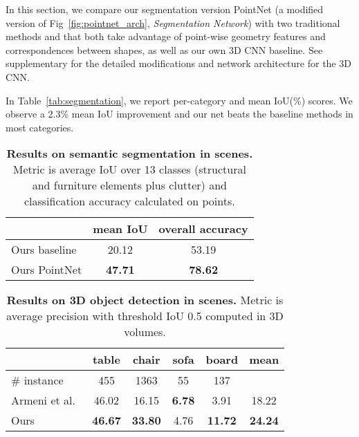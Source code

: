 \documentclass[10pt,twocolumn,letterpaper]{article}
\begin{document}
In this section, we compare our segmentation version PointNet (a modified version of Fig~\ref{fig:pointnet_arch}, \textit{Segmentation Network}) with two traditional methods \cite{Wu2014248} and \cite{Yi16} that both take advantage of point-wise geometry features and correspondences between shapes, as well as our own 3D CNN baseline.
See supplementary for the detailed modifications and network architecture for the 3D CNN.

In Table~\ref{tab:segmentation}, we report per-category and mean IoU(\%) scores. We observe a 2.3\% mean IoU improvement and our net beats the baseline methods in most categories.


\begin{table}[b!]
    \centering
    \small
    \begin{tabular}[width=\linewidth]{l|c|c}
    \hline
    ~             & mean IoU  & overall accuracy \\ \hline
    Ours baseline          &  20.12 & 53.19    \\ \hline
    Ours PointNet          & \textbf{47.71} & \textbf{78.62}  \\ \hline
    \end{tabular}
    \caption{\textbf{Results on semantic segmentation in scenes.} Metric is average IoU over 13 classes (structural and furniture elements plus clutter) and classification accuracy calculated on points. }
    \label{tab:semantic_segmentation}
\end{table}

\begin{table}[b!]
    \centering
    \small
    \begin{tabular}[width=\linewidth]{l|cccc|c}
    \hline
    ~                              & table & chair & sofa & board & mean  \\ \hline
    \# instance & 455 & 1363 & 55 & 137 & ~ \\ \hline
    Armeni et al.~\cite{armeni_cvpr16}          & 46.02 & 16.15 & \textbf{6.78} & 3.91  & 18.22 \\ \hline
    Ours & \textbf{46.67}     & \textbf{33.80 }    & 4.76    & \textbf{11.72}     & \textbf{24.24}     \\ \hline
    \end{tabular}
    \caption{\textbf{Results on 3D object detection in scenes.} Metric is average precision with threshold IoU 0.5 computed in 3D volumes.}
    \label{tab:3d_detection}
\end{table}
\end{document}
